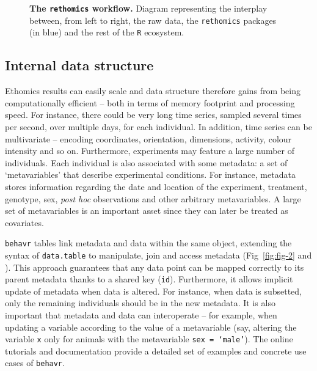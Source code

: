 \documentclass[10pt,letterpaper]{article}\usepackage[]{graphicx}\usepackage[]{color}
\begin{document}



\begin{figure}[!h]
	\caption{{\bf The \texttt{rethomics} workflow.}
		Diagram representing the interplay between, from left to right, the raw data, the \texttt{rethomics} packages (in blue) and the rest of the \texttt{R} ecosystem.}
	\label{fig:fig-1}
\end{figure}


\subsection*{Internal data structure}

Ethomics results can easily scale and data structure therefore gains from being computationally efficient -- both in terms of memory footprint and processing speed.
For instance, there could be very long time series, sampled several times per second, over multiple days, for each individual. %
In addition, time series can be multivariate -- encoding coordinates, orientation, dimensions, activity, colour intensity and so on.
Furthermore, experiments may  feature a large number of individuals. %
Each individual is also associated with some metadata: a set of `metavariables' that describe experimental conditions.
For instance, metadata stores information regarding the date and location of the experiment, treatment, genotype, sex, \emph{post hoc} observations and other arbitrary metavariables.
A large set of metavariables is an important asset since they can later be treated as covariates. 

\texttt{behavr} tables link metadata and data within the same object, extending the syntax of \texttt{data.table} to manipulate, join and access metadata (Fig~\ref{fig:fig-2} and ).
This approach guarantees that any data point can be mapped correctly to its parent metadata thanks to a shared key (\texttt{id}).
Furthermore, it allows implicit update of metadata when data is altered.
For instance, when data is subsetted, only the remaining individuals should be in the new metadata. 
It is also important that metadata and data can interoperate --
for example, when updating a variable according to the value of a metavariable (say, altering the variable \texttt{x} only for animals with the metavariable \texttt{sex = `male'}).
The online tutorials and documentation provide a detailed set of examples and concrete use cases of \texttt{behavr}. 
\end{document}
